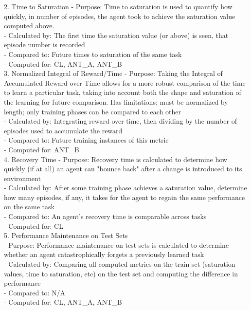 2. Time to Saturation
    - Purpose: Time to saturation is used to quantify how quickly, in number of episodes, the agent took to achieve the saturation value computed above.\\
    - Calculated by: The first time the saturation value (or above) is seen, that episode number is recorded\\
    - Compared to: Future times to saturation of the same task\\
    - Computed for: CL, ANT\_A, ANT\_B\\

3. Normalized Integral of Reward/Time
    - Purpose: Taking the Integral of Accumulated Reward over Time allows for a more robust comparison of the time to learn a particular task, taking into account both the shape and saturation of the learning for future comparison. Has limitations; must be normalized by length; only training phases can be compared to each other \\
    - Calculated by: Integrating reward over time, then dividing by the number of episodes used to accumulate the reward\\
    - Compared to: Future training instances of this metric\\
    - Computed for: ANT\_B\\

4. Recovery Time
    - Purpose: Recovery time is calculated to determine how quickly (if at all) an agent can "bounce back" after a change is introduced to its environment\\
    - Calculated by: After some training phase achieves a saturation value, determine how many episodes, if any, it takes for the agent to regain the same performance on the same task\\
    - Compared to: An agent's recovery time is comparable across tasks\\
    - Computed for: CL\\

5. Performance Maintenance on Test Sets\\
    - Purpose: Performance maintenance on test sets is calculated to determine whether an agent catastrophically forgets a previously learned task\\
    - Calculated by: Comparing all computed metrics on the train set (saturation values, time to saturation, etc) on the test set and computing the difference in performance\\
    - Compared to: N/A\\
    - Computed for: CL, ANT\_A, ANT\_B\\

